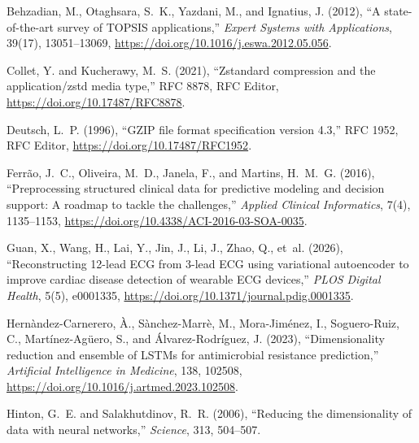 \begin{thebibliography}{}
\newcommand{\enquote}[1]{``#1''}

Behzadian, M., Otaghsara, S.~K., Yazdani, M., and Ignatius, J. (2012), \enquote{A state-of-the-art survey of TOPSIS applications,} \emph{Expert Systems with Applications}, 39(17), 13051--13069, \url{https://doi.org/10.1016/j.eswa.2012.05.056}.

Collet, Y. and Kucherawy, M.~S. (2021), \enquote{Zstandard compression and the application/zstd media type,} RFC 8878, RFC Editor, \url{https://doi.org/10.17487/RFC8878}.

Deutsch, L.~P. (1996), \enquote{GZIP file format specification version 4.3,} RFC 1952, RFC Editor, \url{https://doi.org/10.17487/RFC1952}.

Ferr{\~a}o, J.~C., Oliveira, M.~D., Janela, F., and Martins, H.~M.~G. (2016), \enquote{Preprocessing structured clinical data for predictive modeling and decision support: A roadmap to tackle the challenges,} \emph{Applied Clinical Informatics}, 7(4), 1135--1153, \url{https://doi.org/10.4338/ACI-2016-03-SOA-0035}.

Guan, X., Wang, H., Lai, Y., Jin, J., Li, J., Zhao, Q., et~al. (2026), \enquote{Reconstructing 12-lead ECG from 3-lead ECG using variational autoencoder to improve cardiac disease detection of wearable ECG devices,} \emph{PLOS Digital Health}, 5(5), e0001335, \url{https://doi.org/10.1371/journal.pdig.0001335}.

Hern{\`a}ndez-Carnerero, {\`A}., S{\`a}nchez-Marr{\`e}, M., Mora-Jim{\'e}nez, I., Soguero-Ruiz, C., Mart{\'i}nez-Ag{\"u}ero, S., and {\'A}lvarez-Rodr{\'i}guez, J. (2023), \enquote{Dimensionality reduction and ensemble of LSTMs for antimicrobial resistance prediction,} \emph{Artificial Intelligence in Medicine}, 138, 102508, \url{https://doi.org/10.1016/j.artmed.2023.102508}.

Hinton, G.~E. and Salakhutdinov, R.~R. (2006), \enquote{Reducing the dimensionality of data with neural networks,} \emph{Science}, 313, 504--507.


\end{thebibliography}
